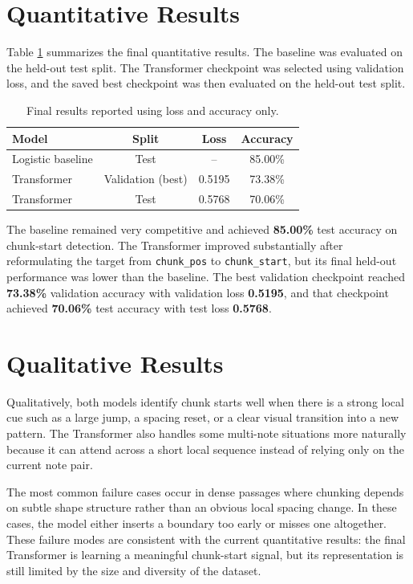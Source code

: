 \documentclass[final]{article}
\begin{document}
\section*{Quantitative Results}
Table \ref{tab:results} summarizes the final quantitative results. The baseline was evaluated on the held-out test split. The Transformer checkpoint was selected using validation loss, and the saved best checkpoint was then evaluated on the held-out test split.

\begin{table}[!h]
\centering
\small
\begin{tabular}{lccc}
\toprule
Model & Split & Loss & Accuracy \\
\midrule
Logistic baseline & Test & -- & 85.00\% \\
Transformer & Validation (best) & 0.5195 & 73.38\% \\
Transformer & Test & 0.5768 & 70.06\% \\
\bottomrule
\end{tabular}
\caption{Final results reported using loss and accuracy only.}
\label{tab:results}
\end{table}

The baseline remained very competitive and achieved \textbf{85.00\%} test accuracy on chunk-start detection. The Transformer improved substantially after reformulating the target from \texttt{chunk\_pos} to \texttt{chunk\_start}, but its final held-out performance was lower than the baseline. The best validation checkpoint reached \textbf{73.38\%} validation accuracy with validation loss \textbf{0.5195}, and that checkpoint achieved \textbf{70.06\%} test accuracy with test loss \textbf{0.5768}.

\section*{Qualitative Results}
Qualitatively, both models identify chunk starts well when there is a strong local cue such as a large jump, a spacing reset, or a clear visual transition into a new pattern. The Transformer also handles some multi-note situations more naturally because it can attend across a short local sequence instead of relying only on the current note pair.

The most common failure cases occur in dense passages where chunking depends on subtle shape structure rather than an obvious local spacing change. In these cases, the model either inserts a boundary too early or misses one altogether. These failure modes are consistent with the current quantitative results: the final Transformer is learning a meaningful chunk-start signal, but its representation is still limited by the size and diversity of the dataset.
\end{document}
